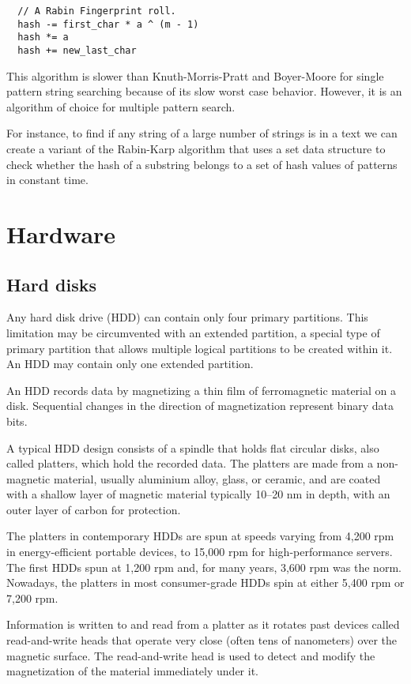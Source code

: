 \documentclass[12pt, oneside]{book}
\begin{document}
\begin{lstlisting}
  // A Rabin Fingerprint roll.
  hash -= first_char * a ^ (m - 1)
  hash *= a
  hash += new_last_char
\end{lstlisting}

This algorithm is slower than Knuth-Morris-Pratt and Boyer-Moore for single
pattern string searching because of its slow worst case behavior. However, it is
an algorithm of choice for multiple pattern search.

For instance, to find if any string of a large number of strings is in a text we
can create a variant of the Rabin-Karp algorithm that uses a set data structure
to check whether the hash of a substring belongs to a set of hash values of
patterns in constant time.

\chapter{Hardware}
\section{Hard disks}
Any hard disk drive (HDD) can contain only four primary partitions. This
limitation may be circumvented with an extended partition, a special type of
primary partition that allows multiple logical partitions to be created within
it. An HDD may contain only one extended partition.

An HDD records data by magnetizing a thin film of ferromagnetic material on a
disk. Sequential changes in the direction of magnetization represent binary
data bits.

A typical HDD design consists of a spindle that holds flat circular disks, also
called platters, which hold the recorded data. The platters are made from a
non-magnetic material, usually aluminium alloy, glass, or ceramic, and are
coated with a shallow layer of magnetic material typically 10–20 nm in depth,
with an outer layer of carbon for protection.

The platters in contemporary HDDs are spun at speeds varying from 4,200 rpm in
energy-efficient portable devices, to 15,000 rpm for high-performance servers.
The first HDDs spun at 1,200 rpm and, for many years, 3,600 rpm was the norm.
Nowadays, the platters in most consumer-grade HDDs spin at either 5,400 rpm or
7,200 rpm.

Information is written to and read from a platter as it rotates past devices
called read-and-write heads that operate very close (often tens of nanometers)
over the magnetic surface. The read-and-write head is used to detect and modify
the magnetization of the material immediately under it.
\end{document}
